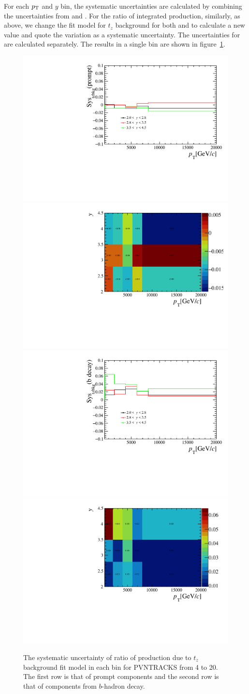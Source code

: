 For each $p_{\mathrm{T}}$ and $y$ bin, the systematic uncertainties are calculated by combining the uncertainties from \jpsi and \psitwos. For 
the ratio of integrated production, similarly, as above, we change the fit model for $t_z$ background for both \jpsi and \psitwos to calculate a 
new value and quote the variation as a systematic uncertainty. The uncertainties for \pandb are calculated separately.
The results in a single bin are shown in figure~\ref{sys_tzbkg}. 
\begin{figure}[!tbp]
    \begin{center}
      \includegraphics[width=0.49\linewidth]{pdf/SysTzPlot/tzbkg/n1Errp_point.pdf}
      \includegraphics[width=0.49\linewidth]{pdf/SysTzPlot/tzbkg/n1Errp.pdf}
      \vspace*{-0.5cm}
      \includegraphics[width=0.49\linewidth]{pdf/SysTzPlot/tzbkg/n1Errb_point.pdf}
      \includegraphics[width=0.49\linewidth]{pdf/SysTzPlot/tzbkg/n1Errb.pdf}
    \end{center}
    \caption{The systematic uncertainty of ratio of production due to $t_z$ background fit model in each bin for PVNTRACKS from 4 to 20. The first row is that of prompt components and the second row is that of components from $b$-hadron decay.
      }
    \label{sys_tzbkg}
\end{figure}

